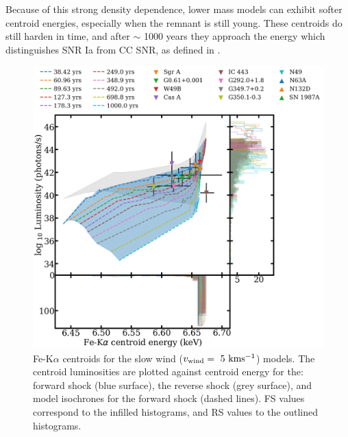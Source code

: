 \documentclass[twocolumn]{aastex631}
\begin{document}
Because of this strong density dependence, lower mass models can exhibit softer centroid energies, especially when the remnant is still young. These centroids do still harden in time, and after $\sim$ 1000 years they approach the energy which distinguishes SNR Ia from CC SNR, as defined in \citet{yamaguchi}.
\begin{figure}[htb]
    \centering
    \includegraphics[scale=0.18]{fscentslow.png}
    \caption{Fe-K$\alpha$ centroids for the slow wind ($v_{\rm wind}=~5~\rm kms^{-1}$) models. The centroid luminosities are plotted against centroid energy for the: forward shock (blue surface), the reverse shock (grey surface), and model isochrones for the forward shock (dashed lines). FS values correspond to the infilled histograms, and RS values to the outlined histograms.}
    \label{fig:slow-cent-fs}
\end{figure}
\end{document}
